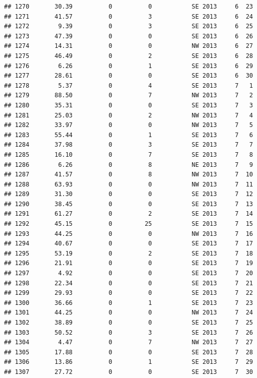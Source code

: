 \documentclass[
]{article}
\begin{document}
\begin{verbatim}
## 1270       30.39          0          0           SE 2013     6  23
## 1271       41.57          0          3           SE 2013     6  24
## 1272        9.39          0          3           SE 2013     6  25
## 1273       47.39          0          0           SE 2013     6  26
## 1274       14.31          0          0           NW 2013     6  27
## 1275       46.49          0          2           SE 2013     6  28
## 1276        6.26          0          1           SE 2013     6  29
## 1277       28.61          0          0           SE 2013     6  30
## 1278        5.37          0          4           SE 2013     7   1
## 1279       88.50          0          7           NW 2013     7   2
## 1280       35.31          0          0           SE 2013     7   3
## 1281       25.03          0          2           NW 2013     7   4
## 1282       33.97          0          0           NW 2013     7   5
## 1283       55.44          0          1           SE 2013     7   6
## 1284       37.98          0          3           SE 2013     7   7
## 1285       16.10          0          7           SE 2013     7   8
## 1286        6.26          0          8           NE 2013     7   9
## 1287       41.57          0          8           NW 2013     7  10
## 1288       63.93          0          0           NW 2013     7  11
## 1289       31.30          0          0           SE 2013     7  12
## 1290       38.45          0          0           SE 2013     7  13
## 1291       61.27          0          2           SE 2013     7  14
## 1292       45.15          0         25           SE 2013     7  15
## 1293       44.25          0          0           NW 2013     7  16
## 1294       40.67          0          0           SE 2013     7  17
## 1295       53.19          0          2           SE 2013     7  18
## 1296       21.91          0          0           SE 2013     7  19
## 1297        4.92          0          0           SE 2013     7  20
## 1298       22.34          0          0           SE 2013     7  21
## 1299       29.93          0          0           SE 2013     7  22
## 1300       36.66          0          1           SE 2013     7  23
## 1301       44.25          0          0           NW 2013     7  24
## 1302       38.89          0          0           SE 2013     7  25
## 1303       50.52          0          3           SE 2013     7  26
## 1304        4.47          0          7           NW 2013     7  27
## 1305       17.88          0          0           SE 2013     7  28
## 1306       13.86          0          1           SE 2013     7  29
## 1307       27.72          0          0           SE 2013     7  30

\end{verbatim}
\end{document}
